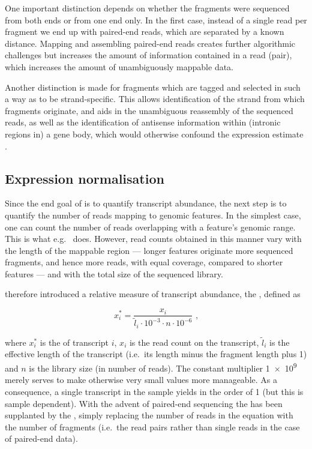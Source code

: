 One important distinction depends on whether the \cdna fragments were sequenced
from both ends or from one end only. In the first case, instead of a single read
per fragment we end up with paired-end reads, which are separated by a known
distance. Mapping and assembling paired-end reads creates further algorithmic
challenges but increases the amount of information contained in a read (pair),
which increases the amount of unambiguously mappable data.

Another distinction is made for fragments which are tagged and selected in such
a way as to be strand-specific. This allows identification of the strand from
which fragments originate, and aids in the unambiguous reassembly of the
sequenced reads, as well as the identification of antisense information within
(intronic regions in) a gene body, which would otherwise confound the expression
estimate \citep{Parkhomchuk:2009}.

\subsection{Expression normalisation}

Since the end goal of \rnaseq is to quantify transcript abundance, the next step
is to quantify the number of reads mapping to genomic features. In the simplest
case, one can count the number of reads overlapping with a feature’s genomic
range. This is what e.g.\  \citep{Anders:2014} does. However, read
counts obtained in this manner vary with the length of the mappable region ---
longer features originate more sequenced fragments, and hence more reads, with
equal coverage, compared to shorter features --- and with the total size of the
sequenced library.

\cite{Mortazavi:2008} therefore introduced a relative measure of transcript
abundance, the \rpkm, defined as

\begin{equation}
    x^*_i = \frac{x_i}{\tilde l_i \cdot 10^{-3} \cdot n \cdot 10^{-6}}
        \text{\ ,}
\end{equation}

where \(x^*_i\) is the \rpkm of transcript \(i\), \(x_i\) is the read count on
the transcript, \(\tilde l_i\) is the effective length of the transcript (i.e.\
its length minus the fragment length plus \num{1}) and \(n\) is the library size
(in number of reads). The constant multiplier \num{1e9} merely serves to make
otherwise very small values more manageable. As a consequence, a single
transcript in the sample yields in the order of \SI{1}{\rpkm} (but this is
sample dependent). With the advent of paired-end sequencing the \rpkm has been
supplanted by the \fpkm, simply replacing the number of reads in the equation
with the number of fragments (i.e.\ the read pairs rather than single reads in
the case of paired-end data).

